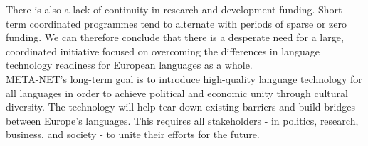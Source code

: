 \begin{multicols}{2}
There is also a lack of continuity in research and development
funding.  Short-term coordinated programmes tend to alternate with
periods of sparse or zero funding. We can therefore conclude that
there is a desperate need for a large, coordinated initiative focused
on overcoming the differences in language technology readiness for
European languages as a whole.\\
META-NET’s long-term goal is to introduce high-quality language
technology for all languages in order to achieve political and
economic unity through cultural diversity. The technology will help
tear down existing barriers and build bridges between Europe’s
languages. This requires all stakeholders - in politics, research,
business, and society - to unite their efforts for the future.

\end{multicols}


\clearpage

